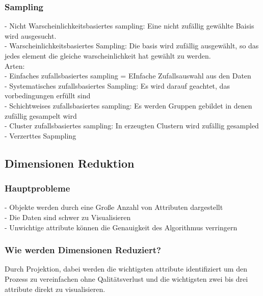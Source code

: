 \documentclass[a4paper]{scrartcl}
\begin{document}
\subsubsection{Sampling}
- Nicht Warscheinlichkeitsbasiertes sampling: Eine nicht zufällig gewählte Baisis wird ausgesucht. \\

- Warscheinlichkeitsbasiertes Sampling: Die basis wird zufällig ausgewählt, so das jedes element die gleiche warscheinlichkeit hat gewählt zu werden.\\
Arten:\\
- Einfaches zufallsbasiertes sampling = EInfache Zufallsauswahl aus den Daten\\
- Systematisches zufallsbasiertes Sampling: Es wird darauf geachtet, das vorbedingungen erfüllt sind\\
- Schichtweises zufallsbasiertes sampling: Es werden Gruppen gebildet in denen zufällig gesampelt wird\\
- Cluster zufallsbasiertes sampling: In erzeugten Clustern wird zufällig gesampled
- Verzerttes Sapmpling\\

\subsection{Dimensionen Reduktion}
\subsubsection{Hauptprobleme}
- Objekte werden durch eine Große Anzahl von Attributen dargestellt\\
- Die Daten sind schwer zu Visualisieren\\
- Unwichtige attribute können die Genauigkeit des Algorithmus verringern\\

\subsubsection{Wie werden Dimensionen Reduziert?}
Durch Projektion, dabei werden die wichtigsten attribute identifiziert um den Prozess zu vereinfachen ohne Qalitätsverlust und die wichtigsten zwei bis drei attribute direkt zu visualisieren.\\
\end{document}
